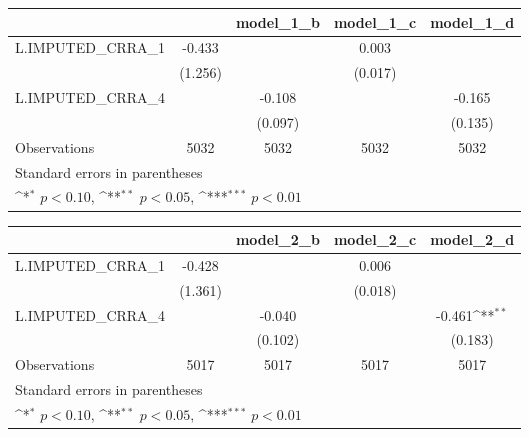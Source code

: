 {
\def\sym#1{\ifmmode^{#1}\else\(^{#1}\)\fi}
\begin{tabular}{l*{4}{c}}
\toprule
                &\multicolumn{1}{c}{}&\multicolumn{1}{c}{model\_1\_b}&\multicolumn{1}{c}{model\_1\_c}&\multicolumn{1}{c}{model\_1\_d}\\
\midrule
L.IMPUTED\_CRRA\_1&   -0.433         &                  &    0.003         &                  \\
                &  (1.256)         &                  &  (0.017)         &                  \\
\addlinespace
L.IMPUTED\_CRRA\_4&                  &   -0.108         &                  &   -0.165         \\
                &                  &  (0.097)         &                  &  (0.135)         \\
\midrule
Observations    &     5032         &     5032         &     5032         &     5032         \\
\bottomrule
\multicolumn{5}{l}{\footnotesize Standard errors in parentheses}\\
\multicolumn{5}{l}{\footnotesize \sym{*} \(p<0.10\), \sym{**} \(p<0.05\), \sym{***} \(p<0.01\)}\\
\end{tabular}
}
{
\def\sym#1{\ifmmode^{#1}\else\(^{#1}\)\fi}
\begin{tabular}{l*{4}{c}}
\toprule
                &\multicolumn{1}{c}{}&\multicolumn{1}{c}{model\_2\_b}&\multicolumn{1}{c}{model\_2\_c}&\multicolumn{1}{c}{model\_2\_d}\\
\midrule
L.IMPUTED\_CRRA\_1&   -0.428         &                  &    0.006         &                  \\
                &  (1.361)         &                  &  (0.018)         &                  \\
\addlinespace
L.IMPUTED\_CRRA\_4&                  &   -0.040         &                  &   -0.461\sym{**} \\
                &                  &  (0.102)         &                  &  (0.183)         \\
\midrule
Observations    &     5017         &     5017         &     5017         &     5017         \\
\bottomrule
\multicolumn{5}{l}{\footnotesize Standard errors in parentheses}\\
\multicolumn{5}{l}{\footnotesize \sym{*} \(p<0.10\), \sym{**} \(p<0.05\), \sym{***} \(p<0.01\)}\\
\end{tabular}
}
